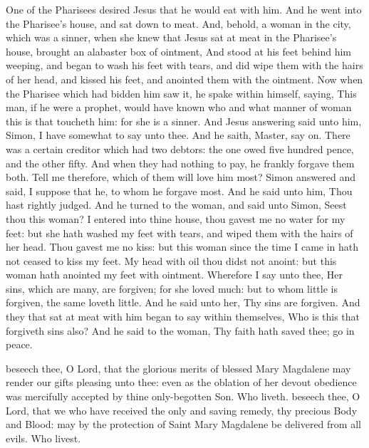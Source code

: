  One of the Pharisees desired Jesus that he would eat with him. And he went into the Pharisee's house, and sat down to meat. And, behold, a woman in the city, which was a sinner, when she knew that Jesus sat at meat in the Pharisee's house, brought an alabaster box of ointment, And stood at his feet behind him weeping, and began to wash his feet with tears, and did wipe them with the hairs of her head, and kissed his feet, and anointed them with the ointment. Now when the Pharisee which had bidden him saw it, he spake within himself, saying, This man, if he were a prophet, would have known who and what manner of woman this is that toucheth him: for she is a sinner. And Jesus answering said unto him, Simon, I have somewhat to say unto thee. And he saith, Master, say on. There was a certain creditor which had two debtors: the one owed five hundred pence, and the other fifty. And when they had nothing to pay, he frankly forgave them both. Tell me therefore, which of them will love him most? Simon answered and said, I suppose that he, to whom he forgave most. And he said unto him, Thou hast rightly judged. And he turned to the woman, and said unto Simon, Seest thou this woman? I entered into thine house, thou gavest me no water for my feet: but she hath washed my feet with tears, and wiped them with the hairs of her head. Thou gavest me no kiss: but this woman since the time I came in hath not ceased to kiss my feet. My head with oil thou didst not anoint: but this woman hath anointed my feet with ointment. Wherefore I say unto thee, Her sins, which are many, are forgiven; for she loved much: but to whom little is forgiven, the same loveth little. And he said unto her, Thy sins are forgiven. And they that sat at meat with him began to say within themselves, Who is this that forgiveth sins also? And he said to the woman, Thy faith hath saved thee; go in peace.

\secret
{} beseech thee, O Lord, that the glorious merits of blessed Mary Magdalene may render our gifts pleasing unto thee: even as the oblation of her devout obedience was mercifully accepted by thine only-begotten Son. Who liveth.
\postcommunion
{} beseech thee, O Lord, that we who have received the only and saving remedy, thy precious Body and Blood: may by the protection of Saint Mary Magdalene be delivered from all evils. Who livest.


